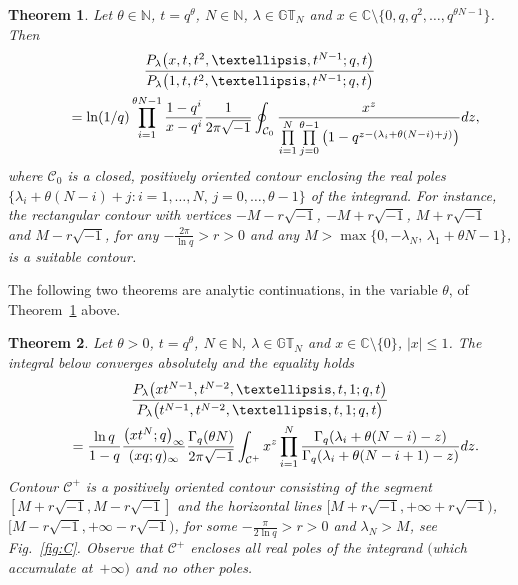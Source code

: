 \documentclass[11pt]{article}
\numberwithin{equation}{section}
\newtheorem{thm}{Theorem}[section]
\newcommand{\C}{\mathbb{C}}
\newcommand{\N}{\mathbb{N}}
\newcommand{\CC}{\mathcal{C}}
\newcommand{\GT}{\mathbb{GT}}
\begin{document}
\begin{thm}\label{macdonaldthm1}
Let $\theta\in\N$, $t = q^{\theta}$, $N\in\N$, $\lambda\in\GT_N$ and $x\in\C \setminus \big\{0, q, q^2, \dots, q^{\theta N - 1}\big\}$. Then
\begin{gather}
\frac{P_{\lambda}\big(x, t, t^2, \dots, t^{N-1}; q, t\big)}{P_{\lambda}\big(1, t, t^2, \dots, t^{N-1}; q, t\big)} \nonumber\\
\qquad {} = \ln(1/q)\prod_{i=1}^{\theta N - 1}{\frac{1 - q^i}{x - q^i}}\frac{1}{2\pi\sqrt{-1}}\oint_{\CC_0}{\frac{x^z}{\prod\limits_{i=1}^N\prod\limits_{j=0}^{\theta -1}{\big(1 - q^{z - (\lambda_i + \theta(N-i) + j)}\big)}}{\rm d}z},\label{macdonaldthm1eqn}
\end{gather}
where $\CC_0$ is a closed, positively oriented contour enclosing the real poles $\{\lambda_i + \theta(N-i) + j \colon i = 1, \dots, N, \, j = 0, \dots, \theta - 1\}$ of the integrand. For instance, the rectangular contour with vertices $-M-r\sqrt{-1}$, $ -M+r\sqrt{-1}$, $M+r\sqrt{-1}$ and $M-r\sqrt{-1}$, for any $-\frac{2\pi}{\ln{q}} > r > 0$ and any $M > \max\{0, -\lambda_N, \, \lambda_1 + \theta N - 1\}$, is a suitable contour.
\end{thm}

The following two theorems are analytic continuations, in the variable $\theta$, of Theorem~\ref{macdonaldthm1} above.

\begin{thm}\label{macdonaldthm2}
Let $\theta > 0$, $t = q^{\theta}$, $N\in\N$, $\lambda\in\GT_N$ and $x\in\C \setminus \{0\}$, $|x|\leq 1$. The integral below converges absolutely and the equality holds
\begin{gather}
\frac{P_{\lambda}\big(xt^{N-1}, t^{N-2}, \dots, t, 1; q, t\big)}{P_{\lambda}\big(t^{N-1}, t^{N-2}, \dots, t, 1; q, t\big)}\nonumber\\
 \qquad{} = \frac{\ln q}{1 - q}\frac{\big(xt^N; q\big)_{\infty}}{(xq; q)_{\infty}}\frac{\Gamma_q(\theta N)}{2\pi\sqrt{-1}}\int_{\CC^+}{x^z\prod_{i=1}^N{\frac{\Gamma_q(\lambda_i + \theta(N-i)-z)}{\Gamma_q(\lambda_i + \theta(N-i+1)-z)}}{\rm d}z}.\label{macdonaldthm2eqn}
\end{gather}
Contour $\CC^+$ is a positively oriented contour consisting of the segment $[M+r\sqrt{-1}, M-r\sqrt{-1}]$ and the horizontal lines $[M+r\sqrt{-1}, +\infty+r\sqrt{-1})$, $[M-r\sqrt{-1}, +\infty-r\sqrt{-1})$, for some $-\frac{\pi}{2\ln{q}} > r > 0$ and $\lambda_N > M$, see Fig.~{\rm \ref{fig:C}}. Observe that $\CC^+$ encloses all real poles of the integrand $($which accumulate at~$+\infty)$ and no other poles.
\end{thm}
\end{document}
